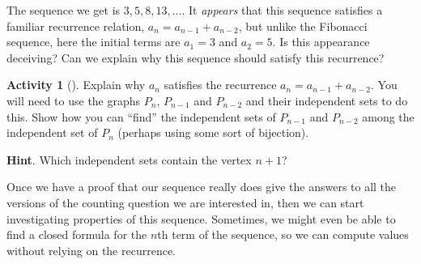 \documentclass[10pt,]{book}
\theoremstyle{plain}
\theoremstyle{definition}
\theoremstyle{definition}
\theoremstyle{definition}
\newtheorem{activity}[project]{Activity}
\theoremstyle{definition}
\numberwithin{equation}{chapter}
\begin{document}
\par
\hypertarget{p-793}{}%
The sequence we get is \(3, 5, 8, 13, \ldots\).  It \emph{appears} that this sequence satisfies a familiar recurrence relation, \(a_n = a_{n-1} + a_{n-2}\), but unlike the Fibonacci sequence, here the initial terms are \(a_1 = 3\) and \(a_2 = 5\).  Is this appearance deceiving?  Can we explain why this sequence should satisfy this recurrence?%
\begin{activity}[]\label{activity-76}
\hypertarget{p-794}{}%
Explain why \(a_n\) satisfies the recurrence \(a_n = a_{n-1} + a_{n-2}\).  You will need to use the graphs \(P_n\), \(P_{n-1}\) and \(P_{n-2}\) and their independent sets to do this.  Show how you can ``find'' the independent sets of \(P_{n-1}\) and \(P_{n-2}\) among the independent set of \(P_{n}\) (perhaps using some sort of bijection).%
\par\smallskip%
\noindent\textbf{Hint}.\hypertarget{hint-68}{}\quad%
\hypertarget{p-795}{}%
Which independent sets contain the vertex \(n+1\)?%
\end{activity}
\hypertarget{p-796}{}%
Once we have a proof that our sequence really does give the answers to all the versions of the counting question we are interested in, then  we can start investigating properties of this sequence.  Sometimes, we might even be able to find a closed formula for the \(n\)th term of the sequence, so we can compute values without relying on the recurrence.%
\typeout{************************************************}
\typeout{************************************************}
\end{document}
